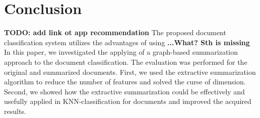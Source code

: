 \documentclass{sigchi}
\begin{document}
\section{Conclusion}\label{sectionConclusion}
\textbf{TODO: add link ot app recommendation}
The proposed document classification system utilizes the advantages of using
\textbf{...What? Sth is missing}
In this paper, we investigated the applying of a graph-based summarization approach to the document classification. 
The evaluation was performed for the original and summarized documents. 
First, we used the extractive summarization algorithm to reduce the number of features and solved the curse of dimension. 
Second, we showed how the extractive summarization could be effectively and usefully applied in KNN-classification for documents and improved the acquired results.


%
%
%
%
%
\balance{}




\end{document}
